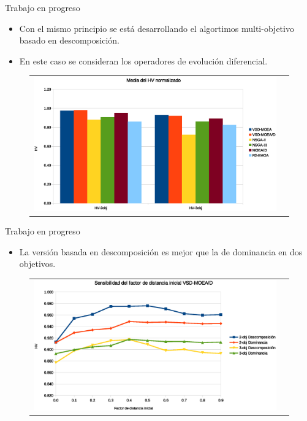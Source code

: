 \documentclass{beamer}
\begin{document}
\begin{frame}{Trabajo en progreso}
\begin{itemize}
\scriptsize
    \item Con el mismo principio se está desarrollando el algortimos multi-objetivo basado en descomposición.
    \item En este caso se consideran los operadores de evolución diferencial.
\end{itemize}
\begin{figure}
\centering
\begin{tabular}{cc}
\includegraphics[scale=0.4]{general_mean_HV.eps} 
\end{tabular}
\end{figure}
\end{frame}

\begin{frame}{Trabajo en progreso}
\begin{itemize}
    \item La versión basada en descomposición es mejor que la de dominancia en dos objetivos.
\end{itemize}
\begin{figure}
\centering
\begin{tabular}{cc}
\includegraphics[scale=0.4]{factor_inicial.eps} 
\end{tabular}
\end{figure}

\end{frame}
\end{document}
